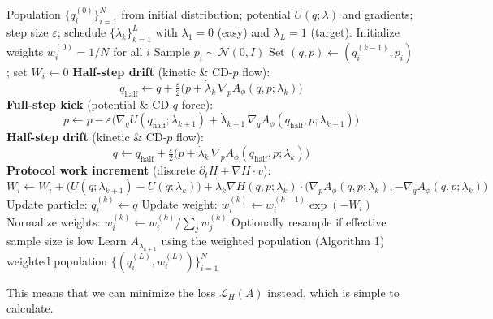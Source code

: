 \documentclass{article}
\begin{document}
\begin{algorithm}[t]
    \caption{Counterdiabatic HMC (CHMC) with population and weighting}
    \label{alg:cd-hmc}
    \begin{algorithmic}[1]
    \Require Population $\{q_i^{(0)}\}_{i=1}^N$ from initial distribution\;; potential $U(q;\lambda)$ and gradients\;; step size $\varepsilon$\;; schedule $\{\lambda_k\}_{k=1}^L$ with $\lambda_1=0$ (easy) and $\lambda_L=1$ (target)\;.
    \State Initialize weights $w_i^{(0)} = 1/N$ for all $i$
        \State Sample $p_i \sim \mathcal{N}(0,I)$
        \State Set $(q,p) \leftarrow (q_i^{(k-1)}, p_i)$; set $W_i \leftarrow 0$
        \State \textbf{Half-step drift} (kinetic \& CD-$p$ flow):
        \[
          q_{\text{half}} \leftarrow q + \tfrac{\varepsilon}{2}\Big(p + \dot{\lambda}_k\, \nabla_p A_\phi(q,p;\lambda_k)\Big)
        \]
        \State \textbf{Full-step kick} (potential \& CD-$q$ force): 
        \[
          p \leftarrow p - \varepsilon\Big(\nabla_q U(q_{\text{half}};\lambda_{k+1}) + \dot{\lambda}_{k+1}\,\nabla_q A_\phi(q_{\text{half}},p;\lambda_{k+1})\Big)
        \]
        \State \textbf{Half-step drift} (kinetic \& CD-$p$ flow):
        \[
          q \leftarrow q_{\text{half}} + \tfrac{\varepsilon}{2}\Big(p + \dot{\lambda}_k\, \nabla_p A_\phi(q_{\text{half}},p;\lambda_k)\Big)
        \]
        \State \textbf{Protocol work increment} (discrete $\partial_t H + \nabla H \cdot v$):
        \[
          W_i \leftarrow W_i + \Big(U(q;\lambda_{k+1}) - U(q;\lambda_k)\Big) 
          + \dot{\lambda}_k \nabla H(q,p;\lambda_k) \cdot \Big(\nabla_p A_\phi(q,p;\lambda_k), -\nabla_q A_\phi(q,p;\lambda_k)\Big)
        \]
        \State Update particle: $q_i^{(k)} \leftarrow q$
        \State Update weight: $w_i^{(k)} \leftarrow w_i^{(k-1)} \exp(-W_i)$
      \EndFor
      \State Normalize weights: $w_i^{(k)} \leftarrow w_i^{(k)} / \sum_j w_j^{(k)}$
      \State Optionally resample if effective sample size is low
      \State Learn $A_{\lambda_{k+1}}$ using the weighted population (Algorithm 1)
    \EndFor
    \State \Return weighted population $\{(q_i^{(L)}, w_i^{(L)})\}_{i=1}^N$
    \end{algorithmic}
    \end{algorithm}



This means that we can minimize the loss $\mathcal{L}_H(A)$ instead, which is simple to calculate.
\end{document}
